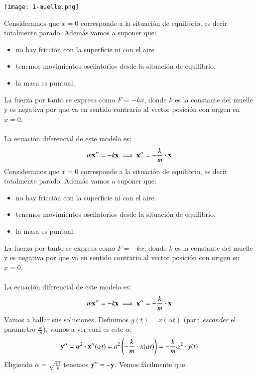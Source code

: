 \begin{eg}[Muelles]\label{eg:muelle}
      \begin{center}
        \texttt{[image: 1-muelle.png]}
      \end{center}
        Consideramos que $x=0$ corresponde a la situación de equilibrio, es decir totalmente parado. Además vamos a suponer que:
        \begin{itemize}
            \item no hay fricción con la superficie ni con el aire.
            \item tenemos movimientos oscilatorios desde la situación de equilibrio.
            \item la masa es puntual.
        \end{itemize}
        La fuerza por tanto se expresa como $F = -k x$, donde $k$ es la constante del muelle y es negativa por que va en sentido contrario al vector posición con origen en $x=0$.\\\\
        La ecuación diferencial de este modelo es:
        $$
            m\mathbf{x}'' = -k \mathbf{x} \implies \mathbf{x}'' = -\frac{k}{m}\cdot \mathbf{x}
        $$
    Consideramos que $x=0$ corresponde a la situación de equilibrio, es decir totalmente parado. Además vamos a suponer que:
    \begin{itemize}
        \item no hay fricción con la superficie ni con el aire.
        \item tenemos movimientos oscilatorios desde la situación de equilibrio.
        \item la masa es puntual.
    \end{itemize}
    La fuerza por tanto se expresa como $F = -k x$, donde $k$ es la constante del muelle y es negativa por que va en sentido contrario al vector posición con origen en $x=0$.\\\\
    La ecuación diferencial de este modelo es:
    $$
        m\mathbf{x}'' = -k \mathbf{x} \implies \mathbf{x}'' = -\frac{k}{m}\cdot \mathbf{x}
    $$
    Vamos a hallar sus soluciones. Definimos $y(t) = x(\alpha t)$ (para \textit{esconder} el parametro $\frac{k}{m}$), vamos a ver cual es este $\alpha$:
    $$
    \mathbf{y}'' = \alpha^2\cdot \mathbf{x}''(\alpha t) = a^2\left(-\frac{k}{m}\cdot x(\alpha t)\right) = -\frac{k}{m} \alpha ^2\cdot y(t)
    $$
    Eligiendo $\alpha = \sqrt{\frac{m}{k}}$ tenemos $\mathbf{y}'' = -\mathbf{y}$. Vemos fácilmente que:\\\\

\end{eg}
